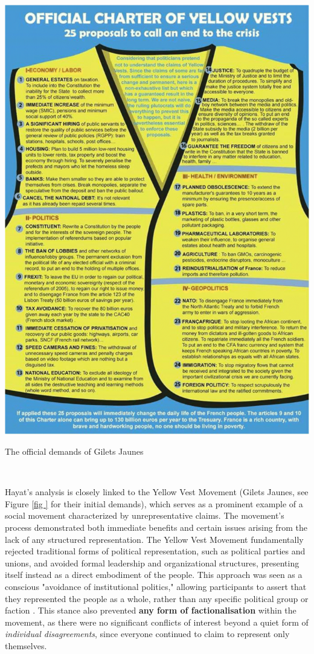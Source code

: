 \begin{marginfigure}
  \includegraphics[scale=0.23]{gilets_jaunes.png}
  \caption{The official demands of Gilets Jaunes}\\
  \label{fig:gilets_jaunes}
\end{marginfigure}


Hayat's analysis is closely linked to the Yellow Vest Movement (Gilets Jaunes, see Figure \ref{fig
} for their initial demands), which serves as a prominent example of a social movement characterized by unrepresentative claims. The movement’s process demonstrated both immediate benefits and certain issues arising from the lack of any structured representation. The Yellow Vest Movement fundamentally rejected traditional forms of political representation, such as political parties and unions, and avoided formal leadership and organizational structures, presenting itself instead as a direct embodiment of the people. This approach was seen as a conscious "avoidance of institutional politics," allowing participants to assert that they represented the people as a whole, rather than any specific political group or faction \parencite[see especially 4-6]{hayat2024}. This stance also prevented \textbf{any form of factionalisation} within the movement, as there were no significant conflicts of interest beyond a quiet form of \textit{individual disagreements}, since everyone continued to claim to represent only themselves.

